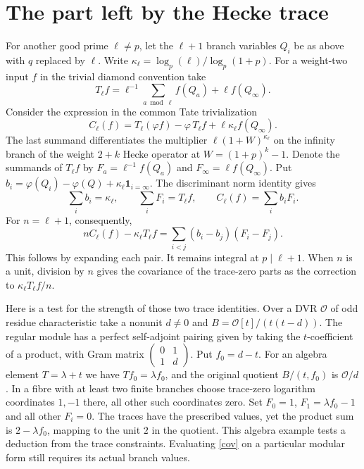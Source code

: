 \documentclass[11pt]{article}
\begin{document}
\section{The part left by the Hecke trace}
For another good prime $\ell\ne p$, let the $\ell+1$ branch variables
$Q_i$ be as above with $q$ replaced by $\ell$. Write
$\kappa_\ell=\log_p(\ell)/\log_p(1+p)$. For a weight-two input $f$
in the trivial diamond convention take
\[
 T_\ell f=\ell^{-1}\sum_{a\bmod\ell} f(Q_a)+\ell f(Q_\infty).
\]
Consider the expression in the common Tate trivialization
\[
 C_\ell(f)=T_\ell(\varphi f)-\varphi\,T_\ell f+
                          \ell\kappa_\ell f(Q_\infty).
\]
The last summand differentiates the multiplier
$\ell(1+W)^{\kappa_\ell}$ on the infinity branch of the weight
$2+k$ Hecke operator at $W=(1+p)^k-1$. Denote the summands of
$T_\ell f$ by $F_a=\ell^{-1}f(Q_a)$ and
$F_\infty=\ell f(Q_\infty)$. Put
$b_i=\varphi(Q_i)-\varphi(Q)+\kappa_\ell\mathbf1_{i=\infty}$.
The discriminant norm identity gives
\[
   \sum_i b_i=\kappa_\ell,\qquad
   \sum_i F_i=T_\ell f,\qquad
   C_\ell(f)=\sum_i b_i F_i .
\]
For $n=\ell+1$, consequently,
\begin{equation}\label{cov}
 n C_\ell(f)-\kappa_\ell T_\ell f
   =\sum_{i<j}(b_i-b_j)(F_i-F_j).
\end{equation}
This follows by expanding each pair. It remains integral at
$p\mid\ell+1$. When $n$ is a unit, division by $n$ gives the
covariance of the trace-zero parts as the correction to
$\kappa_\ell T_\ell f/n$.

Here is a test for the strength of those two trace identities.
Over a DVR $\mathcal O$ of odd residue characteristic take a nonunit
$d\ne0$ and $B=\mathcal O[t]/(t(t-d))$. The regular module has
a perfect self-adjoint pairing given by taking the $t$-coefficient
of a product, with Gram matrix
$\left(\begin{smallmatrix}0&1\\1&d\end{smallmatrix}\right)$.
Put $f_0=d-t$. For an algebra element $T=\lambda+t$ we have
$Tf_0=\lambda f_0$, and the original quotient $B/(t,f_0)$ is
$\mathcal O/d$. In a fibre with at least two finite branches choose
trace-zero logarithm coordinates $1,-1$ there, all other such
coordinates zero. Set $F_0=1$, $F_1=\lambda f_0-1$ and all other
$F_i=0$. The traces have the prescribed values, yet the product
sum is $2-\lambda f_0$, mapping to the unit $2$ in the quotient.
This algebra example tests a deduction from the trace constraints.
Evaluating \eqref{cov} on a particular modular form still requires
its actual branch values.
\end{document}
